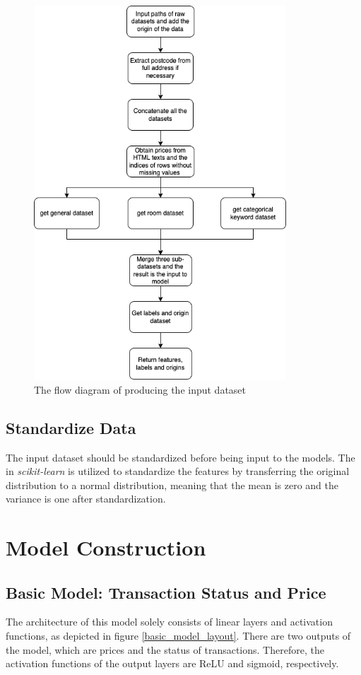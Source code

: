 \documentclass[12pt,twoside]{report}
\begin{document}
\begin{figure}[H]
	\centering
	\includegraphics[height=14cm]{create_input_dataset}
	\caption{The flow diagram of producing the input dataset}
	\label{create_input_dataset}
\end{figure}

\subsection{Standardize Data}
The input dataset should be standardized before being input to the models. The  in \textit{scikit-learn} is utilized to standardize the features by transferring the original distribution to a normal distribution, meaning that the mean is zero and the variance is one after standardization. 
\clearpage 

\section{Model Construction}

\subsection{Basic Model: Transaction Status and Price}
\label{basic_model_price_status_construction}
The architecture of this model solely consists of linear layers and activation functions, as depicted in figure \ref{basic_model_layout}. There are two outputs of the model, which are prices and the status of transactions. Therefore, the activation functions of the output layers are ReLU and sigmoid, respectively.
\\
\end{document}
